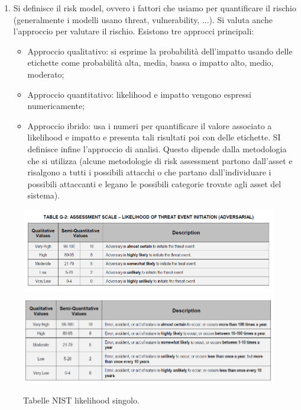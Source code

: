 \begin{enumerate}
    \item Si definisce il risk model, ovvero i fattori che usiamo per quantificare il rischio (generalmente i modelli usano threat, vulnerability, ...). Si valuta anche l'approccio per valutare il rischio. Esistono tre approcci principali:
    \begin{itemize}
        \item Approccio qualitativo: si esprime la probabilità dell'impatto usando delle etichette come probabilità alta, media, bassa o impatto alto, medio, moderato;
        \item Approccio quantitativo: likelihood e impatto vengono espressi numericamente;
        \item Approccio ibrido: usa i numeri per quantificare il valore associato a likelihood e impatto e presenta tali risultati poi con delle etichette. SI definisce infine l'approccio di analisi. Questo dipende dalla metodologia che si utilizza (alcune metodologie di risk assessment partono dall'asset e risalgono a tutti i possibili attacchi o che partano dall'individuare i possibili attaccanti e legano le possibili categorie trovate agli asset del sistema).
    \end{itemize}
\end{enumerate}

\begin{figure}
    \centering
    \includegraphics[width=1\textwidth]{images/11-1.png}
    \includegraphics[width=1\textwidth]{images/11-2.png}
    \caption{Tabelle NIST likelihood singolo.}
    \label{fig:11-1}
\end{figure}

